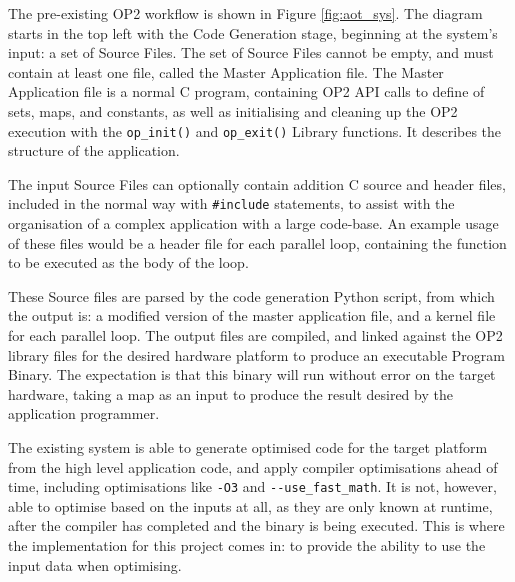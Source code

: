 The pre-existing OP2 workflow is shown in Figure \ref{fig:aot_sys}. The diagram starts in the top left with the Code Generation stage, beginning at the system's input: a set of Source Files. The set of Source Files cannot be empty, and must contain at least one file, called the Master Application file. The Master Application file is a normal C program, containing OP2 API calls to define of sets, maps, and constants, as well as initialising and cleaning up the OP2 execution with the \verb|op_init()| and \verb|op_exit()| Library functions. It describes the structure of the application.
\par
The input Source Files can optionally contain addition C source and header files, included in the normal way with \verb|#include| statements, to assist with the organisation of a complex application with a large code-base. An example usage of these files would be a header file for each parallel loop, containing the function to be executed as the body of the loop.
\par
These Source files are parsed by the code generation Python script, from which the output is: a modified version of the master application file, and a kernel file for each parallel loop. The output files are compiled, and linked against the OP2 library files for the desired hardware platform to produce an executable Program Binary. The expectation is that this binary will run without error on the target hardware, taking a map as an input to produce the result desired by the application programmer.
\par
The existing system is able to generate optimised code for the target platform from the high level application code, and apply compiler optimisations ahead of time, including optimisations like \verb|-O3| and \verb|--use_fast_math|. It is not, however, able to optimise based on the inputs at all, as they are only known at runtime, after the compiler has completed and the binary is being executed. This is where the implementation for this project comes in: to provide the ability to use the input data when optimising.

